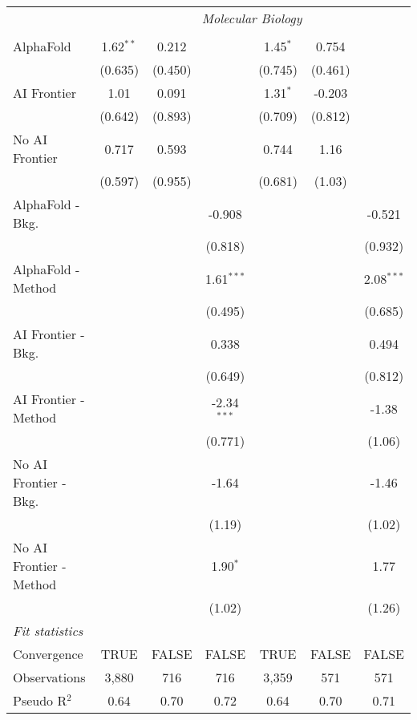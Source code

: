 \begin{tabular}{lcccccc}
 & \multicolumn{6}{c}{\textit{Molecular Biology}} \\ \\
   AlphaFold               & 1.62$^{**}$ & 0.212   &               & 1.45$^{*}$ & 0.754   &   \\   
                           & (0.635)     & (0.450) &               & (0.745)    & (0.461) &   \\   
   AI Frontier             & 1.01        & 0.091   &               & 1.31$^{*}$ & -0.203  &   \\   
                           & (0.642)     & (0.893) &               & (0.709)    & (0.812) &   \\   
   No AI Frontier          & 0.717       & 0.593   &               & 0.744      & 1.16    &   \\   
                           & (0.597)     & (0.955) &               & (0.681)    & (1.03)  &   \\   
   AlphaFold - Bkg.        &             &         & -0.908        &            &         & -0.521\\   
                           &             &         & (0.818)       &            &         & (0.932)\\   
   AlphaFold - Method      &             &         & 1.61$^{***}$  &            &         & 2.08$^{***}$\\   
                           &             &         & (0.495)       &            &         & (0.685)\\   
   AI Frontier - Bkg.      &             &         & 0.338         &            &         & 0.494\\   
                           &             &         & (0.649)       &            &         & (0.812)\\   
   AI Frontier - Method    &             &         & -2.34$^{***}$ &            &         & -1.38\\   
                           &             &         & (0.771)       &            &         & (1.06)\\   
   No AI Frontier - Bkg.   &             &         & -1.64         &            &         & -1.46\\   
                           &             &         & (1.19)        &            &         & (1.02)\\   
   No AI Frontier - Method &             &         & 1.90$^{*}$    &            &         & 1.77\\   
                           &             &         & (1.02)        &            &         & (1.26)\\   
   \midrule
   \emph{Fit statistics}\\
   Convergence             &TRUE         & FALSE   & FALSE         & TRUE       & FALSE   & FALSE\\  
   Observations            & 3,880       & 716     & 716           & 3,359      & 571     & 571\\  
   Pseudo R$^2$            & 0.64        & 0.70    & 0.72          & 0.64       & 0.70    & 0.71\\  
   

\end{tabular}
